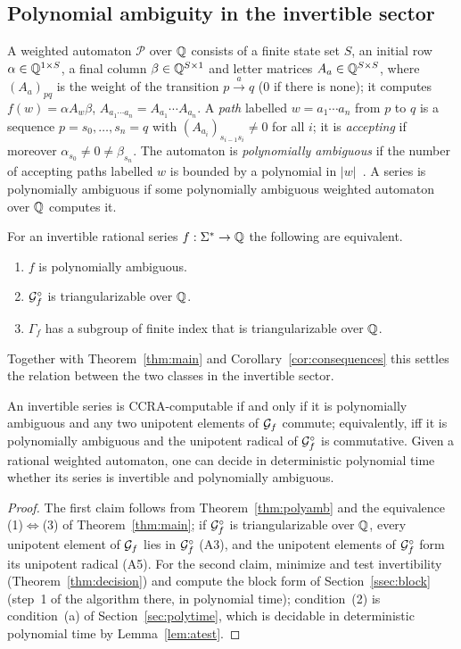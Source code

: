 \subsection{Polynomial ambiguity in the invertible sector}\label{ssec:polyamb}
A weighted automaton $\mathcal P$ over $\mathbb{Q}$ consists of a finite state set $S$, an initial row
$\alpha\in\mathbb{Q}^{1\times S}$, a final column $\beta\in\mathbb{Q}^{S\times 1}$ and letter matrices
$A_a\in\mathbb{Q}^{S\times S}$, where $(A_a)_{pq}$ is the weight of the transition $p\xrightarrow{a}q$
($0$ if there is none); it computes $f(w)=\alpha A_w\beta$, $A_{a_1\cdots a_n}=A_{a_1}\cdots A_{a_n}$.
A \emph{path} labelled $w=a_1\cdots a_n$ from $p$ to $q$ is a sequence $p=s_0,\ldots,s_n=q$ with
$(A_{a_i})_{s_{i-1}s_i}\ne0$ for all $i$; it is \emph{accepting} if moreover $\alpha_{s_0}\ne0\ne\beta_{s_n}$.
The automaton is \emph{polynomially ambiguous} if the number of accepting paths labelled $w$ is
bounded by a polynomial in $|w|$~\cite{MPS26,PS24}. A series is polynomially ambiguous if some
polynomially ambiguous weighted automaton over $\mathbb{Q}$ computes it.

\begin{theorem}\label{thm:polyamb}
For an invertible rational series $f:\Sigma^*\to\mathbb{Q}$ the following are equivalent.
\begin{enumerate}
\item $f$ is polynomially ambiguous.
\item $\mathcal{G}_f^\circ$ is triangularizable over $\mathbb{Q}$.
\item $\Gamma_f$ has a subgroup of finite index that is triangularizable over $\mathbb{Q}$.
\end{enumerate}
\end{theorem}

Together with Theorem~\ref{thm:main} and Corollary~\ref{cor:consequences} this settles the
relation between the two classes in the invertible sector.

\begin{corollary}\label{cor:polyamb}
An invertible series is CCRA-computable if and only if it is polynomially ambiguous and any two
unipotent elements of $\mathcal{G}_f$ commute; equivalently, iff it is polynomially ambiguous and the
unipotent radical of $\mathcal{G}_f^\circ$ is commutative. Given a rational weighted automaton, one can
decide in deterministic polynomial time whether its series is invertible and polynomially ambiguous.
\end{corollary}
\begin{proof}
The first claim follows from Theorem~\ref{thm:polyamb} and the equivalence (1)$\Leftrightarrow$(3) of
Theorem~\ref{thm:main}; if $\mathcal{G}_f^\circ$ is triangularizable over $\mathbb{Q}$, every unipotent
element of $\mathcal{G}_f$ lies in $\mathcal{G}_f^\circ$ (A3), and the unipotent elements of $\mathcal{G}_f^\circ$ form its
unipotent radical (A5). For the second claim, minimize and test invertibility
(Theorem~\ref{thm:decision}) and compute the block form of Section~\ref{ssec:block} (step~1 of the
algorithm there, in polynomial time); condition~(2) is condition~(a) of Section~\ref{sec:polytime}, which
is decidable in deterministic polynomial time by Lemma~\ref{lem:atest}.
\end{proof}


